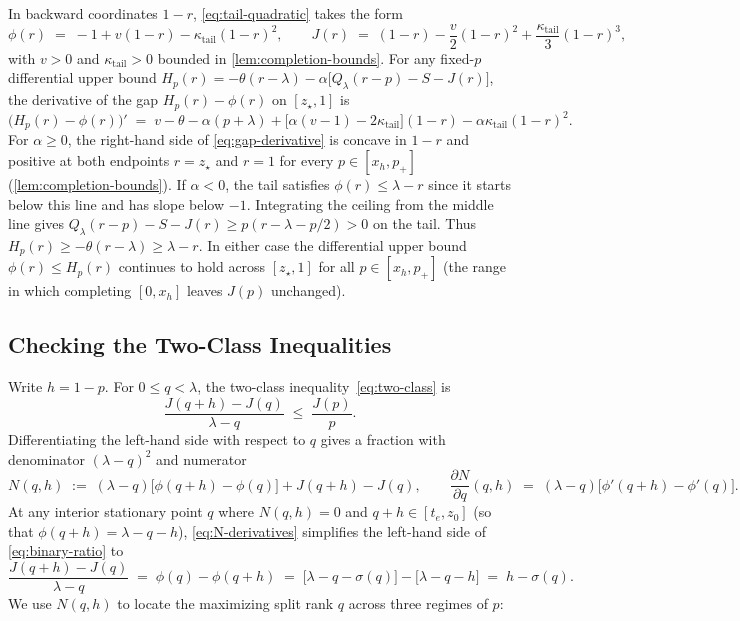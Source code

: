 \documentclass[11pt]{article}
\numberwithin{equation}{section}
\theoremstyle{plain}
\theoremstyle{definition}
\newcommand{\1}{\mathbf{1}}
\begin{document}
In backward coordinates $1 - r$, \cref{eq:tail-quadratic} takes the form
\begin{equation}
  \phi(r) \;=\; -1 + v(1 - r) - \kappa_{\mathrm{tail}}(1 - r)^2,
  \qquad
  J(r) \;=\; (1 - r) - \frac{v}{2}(1 - r)^2 + \frac{\kappa_{\mathrm{tail}}}{3}(1 - r)^3,
  \label{eq:tail-backward}
\end{equation}
with $v > 0$ and $\kappa_{\mathrm{tail}} > 0$ bounded in \cref{lem:completion-bounds}. For any fixed-$p$ differential upper bound $H_p(r) = -\theta(r - \lambda) - \alpha\bigl[Q_\lambda(r - p) - S - J(r)\bigr]$, the derivative of the gap $H_p(r) - \phi(r)$ on $[z_\star, 1]$ is
\begin{equation}
  \bigl(H_p(r) - \phi(r)\bigr)' \;=\; v - \theta - \alpha(p + \lambda) + \bigl[\alpha(v - 1) - 2\kappa_{\mathrm{tail}}\bigr](1 - r) - \alpha\kappa_{\mathrm{tail}}(1 - r)^2.
  \label{eq:gap-derivative}
\end{equation}
For $\alpha\ge0$, the right-hand side of \cref{eq:gap-derivative} is concave in $1-r$ and positive at both endpoints $r = z_\star$ and $r = 1$ for every $p \in [x_h, p_+]$ (\cref{lem:completion-bounds}). If $\alpha<0$, the tail satisfies $\phi(r)\le\lambda-r$ since it starts below this line and has slope below $-1$. Integrating the ceiling from the middle line gives $Q_\lambda(r-p)-S-J(r)\ge p(r-\lambda-p/2)>0$ on the tail. Thus $H_p(r)\ge-\theta(r-\lambda)\ge\lambda-r$. In either case the differential upper bound $\phi(r)\le H_p(r)$ continues to hold across $[z_\star, 1]$ for all $p \in [x_h, p_+]$ (the range in which completing $[0, x_h]$ leaves $J(p)$ unchanged).

\subsection{Checking the Two-Class Inequalities}
\label{app:checking-binary}

Write $h = 1 - p$. For $0 \le q < \lambda$, the two-class inequality~\eqref{eq:two-class} is
\begin{equation}
  \frac{J(q + h) - J(q)}{\lambda - q} \;\le\; \frac{J(p)}{p}.
  \label{eq:binary-ratio}
\end{equation}
Differentiating the left-hand side with respect to $q$ gives a fraction with denominator $(\lambda - q)^2$ and numerator
\begin{equation}
  N(q, h) \;:=\; (\lambda - q)\bigl[\phi(q + h) - \phi(q)\bigr] + J(q + h) - J(q),
  \qquad
  \frac{\partial N}{\partial q}(q, h) \;=\; (\lambda - q)\bigl[\phi'(q + h) - \phi'(q)\bigr].
  \label{eq:N-derivatives}
\end{equation}
At any interior stationary point $q$ where $N(q, h) = 0$ and $q + h \in [t_e, z_0]$ (so that $\phi(q + h) = \lambda - q - h$), \cref{eq:N-derivatives} simplifies the left-hand side of \cref{eq:binary-ratio} to
\[
  \frac{J(q + h) - J(q)}{\lambda - q} \;=\; \phi(q) - \phi(q + h) \;=\; \bigl[\lambda - q - \sigma(q)\bigr] - \bigl[\lambda - q - h\bigr] \;=\; h - \sigma(q).
\]
We use $N(q, h)$ to locate the maximizing split rank $q$ across three regimes of $p$:
\end{document}
